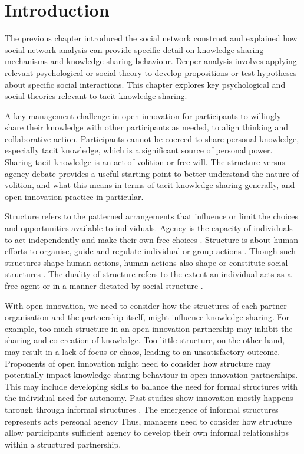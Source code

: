 
\section{Introduction}

The previous chapter introduced the social network construct and explained how social network analysis can provide specific detail on knowledge sharing mechanisms and knowledge sharing behaviour. Deeper analysis involves applying relevant psychological or social theory to develop propositions or test hypotheses about specific social interactions. This chapter explores key psychological and social theories relevant to tacit knowledge sharing. \medskip

A key management challenge in open innovation for participants to willingly share their knowledge with other participants as needed, to align thinking and collaborative action. Participants cannot be coerced to share personal knowledge, especially tacit knowledge, which is a significant source of personal power. Sharing tacit knowledge is an act of volition or free-will. The structure versus agency debate provides a useful starting point to better understand the nature of volition, and what this means in terms of tacit knowledge sharing generally, and open innovation practice in particular. \medskip

Structure refers to the patterned arrangements that influence or limit the choices and opportunities available to individuals. Agency is the capacity of individuals to act independently and make their own free choices \citep{barker2016cultural}. Structure is about human efforts to organise, guide and regulate individual or group actions \citep{bandura1999social}. Though such structures shape human actions, human actions also shape or constitute social structures \citep{sewell1992theory}. The duality of structure refers to the extent an individual acts as a free agent or in a manner dictated by social structure \citep{giddens1984constitution}. \medskip

With open innovation, we need to consider how the structures of each partner organisation and the partnership itself, might influence knowledge sharing. For example, too much structure in an open innovation partnership may inhibit the sharing and co-creation of knowledge. Too little structure, on the other hand, may result in a lack of focus or chaos, leading to an unsatisfactory outcome. Proponents of open innovation might need to consider how structure may potentially impact knowledge sharing behaviour in open innovation partnerships. This may include developing skills to balance the need for formal structures with the individual need for autonomy. Past studies show innovation mostly happens through through informal structures \citep{allen1977role,ibarra1993network,selnes2003promoting}. The emergence of informal structures represents acts personal agency  Thus, managers need to consider how structure allow participants sufficient agency to develop their own informal relationships within a structured partnership.  

